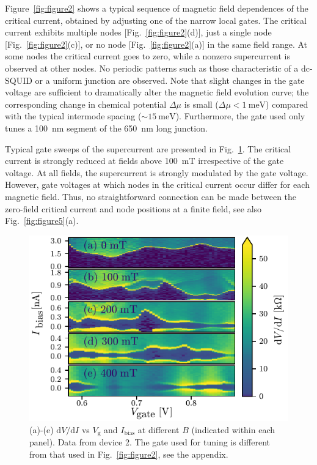 Figure~\ref{fig:figure2} shows a typical sequence of magnetic field dependences of the critical current, obtained by adjusting one of the narrow local gates.
The critical current exhibits multiple nodes [Fig.~\ref{fig:figure2}(d)], just a single node [Fig.~\ref{fig:figure2}(c)], or no node [Fig.~\ref{fig:figure2}(a)] in the same field range.
At some nodes the critical current goes to zero, while a nonzero supercurrent is observed at other nodes.
No periodic patterns such as those characteristic of a dc-SQUID or a uniform junction are observed.
Note that slight changes in the gate voltage are sufficient to dramatically alter the magnetic field evolution curve; the corresponding change in chemical potential $\Delta \mu$ is small ($\Delta \mu < \SI{1}{\milli \electronvolt}$) compared with the typical intermode spacing ($\sim \SI{15}{\milli \electronvolt}$).
Furthermore, the gate used only tunes a \SI{100}{\nano \meter} segment of the \SI{650}{\nano \meter} long junction.

Typical gate sweeps of the supercurrent are presented in Fig.~\ref{fig:figure3}.
The critical current is strongly reduced at fields above \SI{100}{\milli \tesla} irrespective of the gate voltage.
At all fields, the supercurrent is strongly modulated by the gate voltage.
However, gate voltages at which nodes in the critical current occur differ for each magnetic field.
Thus, no straightforward connection can be made between the zero-field critical current and node positions at a finite field, see also Fig.~\ref{fig:figure5}(a).

\begin{figure}
\begin{center}
\includegraphics[width=0.7\columnwidth]{chapter_supercurrent/figures/fig3.pdf}
\caption{(a)-(e) $\mathrm{d}V/\mathrm{d}I$ vs $V_\mathrm{g}$ and $I_\mathrm{bias}$ at different $B$ (indicated within each panel). Data from device 2. The gate used for tuning is different from that used in Fig.~\ref{fig:figure2}, see the appendix. }
\label{fig:figure3}
\end{center}
\end{figure}

